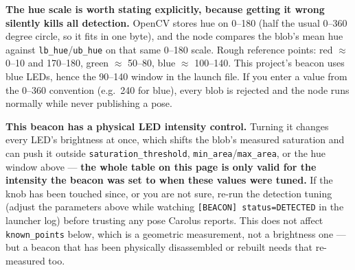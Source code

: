 \documentclass[11pt]{report}
\newenvironment{warningbox}%
  {\begin{lrbox}{\warnbox}\begin{minipage}{0.90\textwidth}}%
  {\end{minipage}\end{lrbox}%
   \begin{center}\fcolorbox{black}{codebg}{\usebox{\warnbox}}\end{center}}
\begin{document}
\textbf{The hue scale is worth stating explicitly, because getting it wrong
silently kills all detection.} OpenCV stores hue on 0--180 (half the usual
0--360 degree circle, so it fits in one byte), and the node compares the
blob's mean hue against \texttt{lb\_hue}/\texttt{ub\_hue} on that same
0--180 scale. Rough reference points: red $\approx$ 0--10 and 170--180,
green $\approx$ 50--80, blue $\approx$ 100--140. This project's beacon uses
blue LEDs, hence the 90--140 window in the launch file. If you enter a value
from the 0--360 convention (e.g.\ 240 for blue), every blob is rejected and
the node runs normally while never publishing a pose.

\begin{warningbox}
\textbf{This beacon has a physical LED intensity control.} Turning it
changes every LED's brightness at once, which shifts the blob's measured
saturation and can push it outside \texttt{saturation\_threshold},
\texttt{min\_area}/\texttt{max\_area}, or the hue window above --- \textbf{the
whole table on this page is only valid for the intensity the beacon was set
to when these values were tuned.} If the knob has been touched since, or you
are not sure, re-run the detection tuning (adjust the parameters above while
watching \texttt{[BEACON] status=DETECTED} in the launcher log) before
trusting any pose Carolus reports. This does not affect \texttt{known\_points}
below, which is a geometric measurement, not a brightness one --- but a
beacon that has been physically disassembled or rebuilt needs that
re-measured too.
\end{warningbox}
\end{document}
